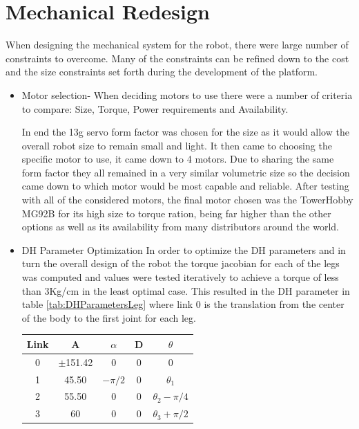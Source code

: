 \documentclass[12pt]{report}
\begin{document}
\chapter{Mechanical Redesign}
When designing the mechanical system for the robot, there were large number of constraints to overcome. Many of the constraints can be refined down to the cost and the size constraints set forth during the development of the platform. 
    \begin{itemize}
        \item Motor selection- 
            When deciding motors to use there were a number of criteria to compare: Size, Torque, Power requirements and Availability.

            In end the 13g servo form factor was chosen for the size as it would allow the overall robot size to remain small and light. It then came to choosing the specific motor to use, it came down to 4 motors. Due to sharing the same form factor they all remained in a very similar volumetric size so the decision came down to which motor would be most capable and reliable. After testing with all of the considered motors, the final motor chosen was the TowerHobby MG92B for its high size to torque ration, being far higher than the other options as well as its availability from many distributors around the world.\newline
        \item DH Parameter Optimization
        In order to optimize the DH parameters and in turn the overall design of the robot the torque jacobian for each of the legs was computed and  values were tested iteratively to achieve a torque of less than 3Kg/cm in the least optimal case. This resulted in the DH parameter in table \ref{tab:DHParametersLeg} where link 0 is the translation from the center of the body to the first joint for each leg. 
        \begin{table}[H]
            \centering
            \begin{tabular}{|c|c|c|c|c|}
            \hline
            Link& A  & $\alpha$ & D & $\theta$ \\
            \hline     
                0 &  $\pm$151.42 & 0 & 0 &0\\
                1 &  45.50 & $-\pi/2$ & 0  &$\theta_1$\\
                2 &  55.50 & 0& 0 & $\theta_2-\pi/4$\\
                3 & 60  &0 & 0  &$\theta_3+\pi/2$\\
            \hline
            \end{tabular}

\end{table}
\end{itemize}
\end{document}
